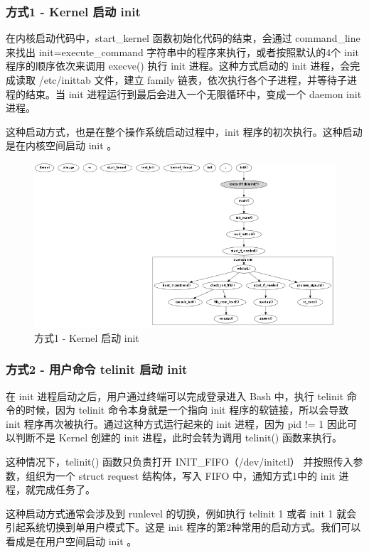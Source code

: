 \subsubsection{方式1 - Kernel 启动 init}

在内核启动代码中，start\_kernel 函数初始化代码的结束，会通过 command\_line
来找出 init=execute\_command 字符串中的程序来执行，或者按照默认的4个 init
程序的顺序依次来调用 execve() 执行 init 进程。这种方式启动的 init
进程，会完成读取 /etc/inittab 文件，建立 family
链表，依次执行各个子进程，并等待子进程的结束。当 init
进程运行到最后会进入一个无限循环中，变成一个 daemon init 进程。

这种启动方式，也是在整个操作系统启动过程中，init
程序的初次执行。这种启动是在内核空间启动 init 。

\begin{figure}[htbp]
\centering
\includegraphics{./figures/how-to-exec-init-1.png}
\caption{方式1 - Kernel 启动 init}
\end{figure}

\subsubsection{方式2 - 用户命令 telinit 启动 init}

在 init 进程启动之后，用户通过终端可以完成登录进入 Bash 中，执行 telinit
命令的时候，因为 telinit 命令本身就是一个指向 init
程序的软链接，所以会导致 init 程序再次被执行。通过这种方式运行起来的 init
进程，因为 pid != 1 因此可以判断不是 Kernel 创建的 init
进程，此时会转为调用 telinit() 函数来执行。

这种情况下，telinit() 函数只负责打开 INIT\_FIFO（/dev/initctl）
并按照传入参数，组织为一个 struct request 结构体，写入 FIFO
中，通知方式1中的 init 进程，就完成任务了。

这种启动方式通常会涉及到 runlevel 的切换，例如执行 telinit 1 或者 init 1
就会引起系统切换到单用户模式下。这是 init
程序的第2种常用的启动方式。我们可以看成是在用户空间启动 init 。


